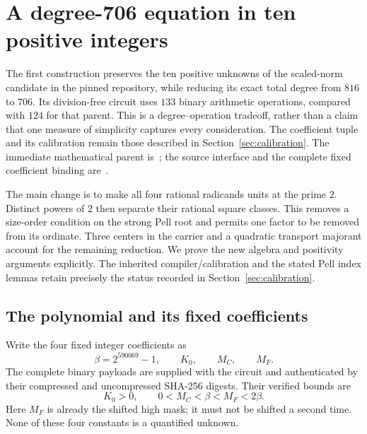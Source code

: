 \section{A degree-706 equation in ten positive integers}
\label{dy:section}

The first construction preserves the ten positive unknowns of the
scaled-norm candidate in the pinned repository, while reducing its exact
total degree from $816$ to $706$.  Its division-free circuit uses $133$
binary arithmetic operations, compared with $124$ for that parent.
This is a degree--operation tradeoff, rather than a claim that one measure
of simplicity captures every consideration.  The coefficient tuple and
its calibration remain those described in Section~\ref{sec:calibration}.
The immediate mathematical parent is~\cite{parent816}; the source interface
and the complete fixed coefficient binding are~\cite{source61,source44}.

The main change is to make all four rational radicands units at the prime
$2$.  Distinct powers of $2$ then separate their rational square classes.
This removes a size-order condition on the strong Pell root and permits
one factor to be removed from its ordinate.  Three centers in the carrier
and a quadratic transport majorant account for the remaining reduction.
We prove the new algebra and positivity arguments explicitly.  The
inherited compiler/calibration and the stated Pell index lemmas retain
precisely the status recorded in Section~\ref{sec:calibration}.

\subsection{The polynomial and its fixed coefficients}
\label{dy:definition}

Write the four fixed integer coefficients as
\[
 \beta=2^{590069}-1,\qquad K_0,\qquad M_C,\qquad M_F.
\]
The complete binary payloads are supplied with the circuit and authenticated
by their compressed and uncompressed SHA-256 digests.  Their verified
bounds are
\begin{equation}
  K_0>0,\qquad 0<M_C<\beta<M_F<2\beta.
  \label{dy:ports}
\end{equation}
Here $M_F$ is already the shifted high mask; it must not be shifted a
second time.  None of these four constants is a quantified unknown.

